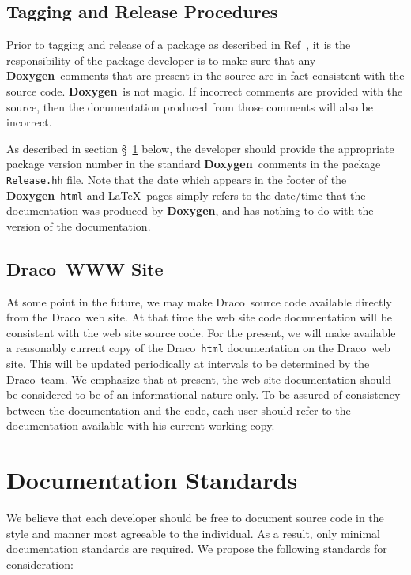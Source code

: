 \documentclass[11pt]{nmemo}
\newcommand{\draco}{{\normalfont\sffamily Draco}}
\newcommand{\doxy}{{\normalfont\bfseries Doxygen}}
\begin{document}
\subsection{Tagging and Release Procedures}
\label{sec:reltag}
Prior to tagging and release of a package as described in Ref~\cite{xtm:9936},
 it is 
the responsibility of the package developer is to make sure that any \doxy\
comments that are present in the source are in fact consistent with the
source code. \doxy\ is not magic. If incorrect comments are provided with
the source, then the documentation produced from those comments will also
be incorrect.

As described in section \S~\ref{sec:std} below, 
the developer should provide 
the appropriate package version number in the standard \doxy\ comments in the 
package \texttt{Release.hh} file.
Note that the date which appears in the footer of the \doxy\ 
\texttt{html} and \LaTeX\ pages
simply refers to the date/time that the documentation was produced by \doxy, 
and has nothing to do with the version of the documentation.

\subsection{\draco\ WWW Site}
\label{sec:www}

At some point in the future, we may make \draco\ source code available
directly from the \draco\ web site. At that time the web site code
documentation will be consistent with the web site source code.
For the present, 
we will make available a reasonably current copy of the \draco\ \texttt{html}
documentation on the \draco\ web site. This will be updated periodically
at intervals to be determined by the \draco\ team. 
We emphasize that at present, the web-site documentation should be 
considered to be of an informational nature only. To be assured of
consistency between the documentation and the code, each
user should refer to the documentation available with 
his current working copy.



\section{Documentation Standards}
\label{sec:std}

We believe that each developer should be free to document source code
in the style and manner most agreeable to the individual. As a result,
only minimal documentation standards are required.  We propose the
following standards for consideration:
\end{document}
